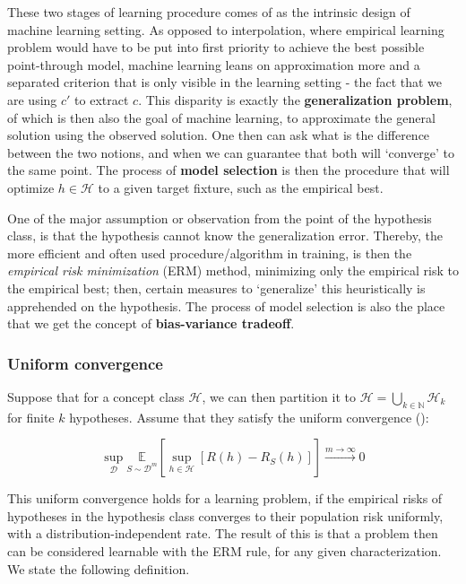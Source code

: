 \documentclass[10pt]{article} %
\begin{document}
These two stages of learning procedure comes of as the intrinsic design of machine learning setting. As opposed to interpolation, where empirical learning problem would have to be put into first priority to achieve the best possible point-through model, machine learning leans on approximation more and a separated criterion that is only visible in the learning setting - the fact that we are using $c'$ to extract $c$. This disparity is exactly the \textbf{generalization problem}, of which is then also the goal of machine learning, to approximate the general solution using the observed solution. One then can ask what is the difference between the two notions, and when we can guarantee that both will `converge' to the same point. The process of \textbf{model selection} is then the procedure that will optimize $h\in \mathcal{H}$ to a given target fixture, such as the empirical best. 

One of the major assumption or observation from the point of the hypothesis class, is that the hypothesis cannot know the generalization error. Thereby, the more efficient and often used procedure/algorithm in training, is then the \textit{empirical risk minimization} (ERM) method, minimizing only the empirical risk to the empirical best; then, certain measures to `generalize' this heuristically is apprehended on the hypothesis. The process of model selection is also the place that we get the concept of \textbf{bias-variance tradeoff}. 
\subsubsection{Uniform convergence}

Suppose that for a concept class $\mathcal{H}$, we can then partition it to $\mathcal{H}=\bigcup_{k\in \mathbb{N}} \mathcal{H}_{k}$ for finite $k$ hypotheses. Assume that they satisfy the uniform convergence (\cite{JMLR:v11:shalev-shwartz10a}): 

\begin{equation}
    \sup_{\mathcal{D}} \underset{S\sim\mathcal{D}^{m}}{\mathbb{E}} \left[ \sup_{h\in\mathcal{H}} [R(h) - R_{S}(h)] \right] \overset{m\to\infty}{\longrightarrow} 0
\end{equation}

This uniform convergence holds for a learning problem, if the empirical risks of hypotheses in the hypothesis class converges to their population risk uniformly, with a distribution-independent rate. The result of this is that a problem then can be considered learnable with the ERM rule, for any given characterization. We state the following definition.
\end{document}
